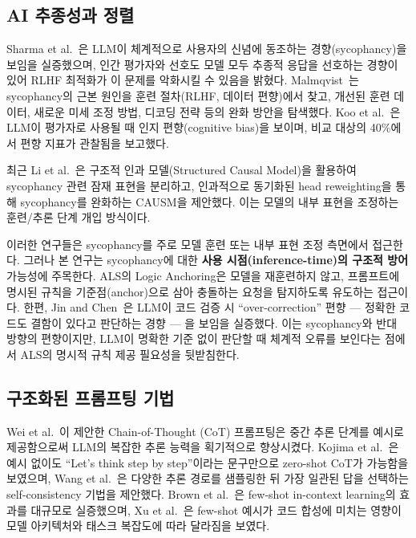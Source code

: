 \documentclass[conference]{IEEEtran}
\begin{document}
\subsection{AI 추종성과 정렬}

Sharma et al.~\cite{sharma2024sycophancy}은 LLM이 체계적으로 사용자의 신념에 동조하는 경향(sycophancy)을 보임을 실증했으며, 인간 평가자와 선호도 모델 모두 추종적 응답을 선호하는 경향이 있어 RLHF 최적화가 이 문제를 악화시킬 수 있음을 밝혔다. Malmqvist~\cite{malmqvist2024sycophancy}는 sycophancy의 근본 원인을 훈련 절차(RLHF, 데이터 편향)에서 찾고, 개선된 훈련 데이터, 새로운 미세 조정 방법, 디코딩 전략 등의 완화 방안을 탐색했다. Koo et al.~\cite{koo2024cognitive}은 LLM이 평가자로 사용될 때 인지 편향(cognitive bias)을 보이며, 비교 대상의 40\%에서 편향 지표가 관찰됨을 보고했다.

최근 Li et al.~\cite{li2025causm}은 구조적 인과 모델(Structured Causal Model)을 활용하여 sycophancy 관련 잠재 표현을 분리하고, 인과적으로 동기화된 head reweighting을 통해 sycophancy를 완화하는 CAUSM을 제안했다. 이는 모델의 내부 표현을 조정하는 훈련/추론 단계 개입 방식이다.

이러한 연구들은 sycophancy를 주로 모델 훈련 또는 내부 표현 조정 측면에서 접근한다. 그러나 본 연구는 sycophancy에 대한 \textbf{사용 시점(inference-time)의 구조적 방어} 가능성에 주목한다. ALS의 Logic Anchoring은 모델을 재훈련하지 않고, 프롬프트에 명시된 규칙을 기준점(anchor)으로 삼아 충돌하는 요청을 탐지하도록 유도하는 접근이다. 한편, Jin and Chen~\cite{jin2025overcorrection}은 LLM이 코드 검증 시 ``over-correction'' 편향 --- 정확한 코드도 결함이 있다고 판단하는 경향 --- 을 보임을 실증했다. 이는 sycophancy와 반대 방향의 편향이지만, LLM이 명확한 기준 없이 판단할 때 체계적 오류를 보인다는 점에서 ALS의 명시적 규칙 제공 필요성을 뒷받침한다.

\subsection{구조화된 프롬프팅 기법}

Wei et al.~\cite{wei2022cot}이 제안한 Chain-of-Thought (CoT) 프롬프팅은 중간 추론 단계를 예시로 제공함으로써 LLM의 복잡한 추론 능력을 획기적으로 향상시켰다. Kojima et al.~\cite{kojima2022zeroshot}은 예시 없이도 ``Let's think step by step''이라는 문구만으로 zero-shot CoT가 가능함을 보였으며, Wang et al.~\cite{wang2023selfconsistency}은 다양한 추론 경로를 샘플링한 뒤 가장 일관된 답을 선택하는 self-consistency 기법을 제안했다. Brown et al.~\cite{brown2020fewshot}은 few-shot in-context learning의 효과를 대규모로 실증했으며, Xu et al.~\cite{xu2024fewshot}은 few-shot 예시가 코드 합성에 미치는 영향이 모델 아키텍처와 태스크 복잡도에 따라 달라짐을 보였다.
\end{document}
